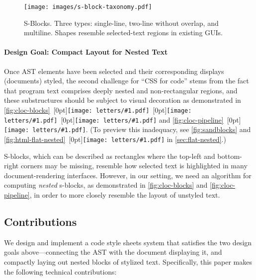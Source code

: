 \documentclass[acmsmall, screen]{acmart}
\newcommand{\parahead}[1]
  {\paragraph{\textbf{#1}}}
\newcommand{\figBubble}[1]{\raisebox{-0.03in}[0pt]{\texttt{[image: letters/\#1.pdf]}}}
\newcommand{\refBubble}[1]
  {~\figBubble{#1}}
\begin{document}
\begin{wrapfigure}[13]{r}{2.4in}
  \vspace{-0.18in} \texttt{[image: images/s-block-taxonomy.pdf]}
  \vspace{0.075in} \caption{S-Blocks. Three types: single-line, two-line without overlap, and multiline.
    Shapes resemble selected-text regions in existing GUIs.
}
\label{fig:s-block}
\end{wrapfigure}
 \parahead{Design Goal: Compact Layout for Nested Text}

Once AST elements have been selected and their corresponding displays (documents) styled,
the second challenge for ``CSS for
code'' stems from the fact that program text comprises deeply nested and non-rectangular regions,
and these substructures should be subject to visual decoration as demonstrated in \autoref{fig:cloc-blocks}\refBubble{b}\refBubble{c}\refBubble{d} and \autoref{fig:cloc-pipeline}\refBubble{f}.
(To preview this inadequacy, see \autoref{fig:sandblocks} and \autoref{fig:html-flat-nested}\refBubble{b} in \autoref{sec:flat-nested}.)


S-blocks, which can be described as rectangles where the top-left and bottom-right corners may be missing, resemble how selected text is highlighted in many document-rendering interfaces. However, in our setting, we need an algorithm for computing \emph{nested} s-blocks, as demonstrated in \autoref{fig:cloc-blocks} and \autoref{fig:cloc-pipeline}, in order to more closely resemble the layout of unstyled text.


\subsection{Contributions}

We design and implement a code style sheets system that satisfies the two design goals above---connecting the AST with the document displaying it, and compactly laying out nested blocks of stylized text. Specifically, this paper makes the following technical contributions:
\end{document}

